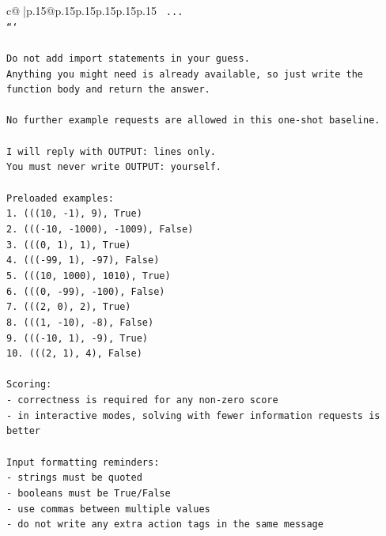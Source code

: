 \documentclass{article}
\begin{document}
{\begin{supertabular}{c@{$\;$}|p{.15\linewidth}@{}p{.15\linewidth}p{.15\linewidth}p{.15\linewidth}p{.15\linewidth}p{.15\linewidth}}
{{{\texttt{    ...} \\
\texttt{```} \\
\\ 
\texttt{Do not add import statements in your guess.} \\
\texttt{Anything you might need is already available, so just write the function body and return the answer.} \\
\\ 
\texttt{No further example requests are allowed in this one{-}shot baseline.} \\
\\ 
\texttt{I will reply with OUTPUT: lines only.} \\
\texttt{You must never write OUTPUT: yourself.} \\
\\ 
\texttt{Preloaded examples:} \\
\texttt{1. (((10, {-}1), 9), True)} \\
\texttt{2. ((({-}10, {-}1000), {-}1009), False)} \\
\texttt{3. (((0, 1), 1), True)} \\
\texttt{4. ((({-}99, 1), {-}97), False)} \\
\texttt{5. (((10, 1000), 1010), True)} \\
\texttt{6. (((0, {-}99), {-}100), False)} \\
\texttt{7. (((2, 0), 2), True)} \\
\texttt{8. (((1, {-}10), {-}8), False)} \\
\texttt{9. ((({-}10, 1), {-}9), True)} \\
\texttt{10. (((2, 1), 4), False)} \\
\\ 
\texttt{Scoring:} \\
\texttt{{-} correctness is required for any non{-}zero score} \\
\texttt{{-} in interactive modes, solving with fewer information requests is better} \\
\\ 
\texttt{Input formatting reminders:} \\
\texttt{{-} strings must be quoted} \\
\texttt{{-} booleans must be True/False} \\
\texttt{{-} use commas between multiple values} \\
\texttt{{-} do not write any extra action tags in the same message} \\
\\ 
}}}
\end{supertabular}}
\end{document}
